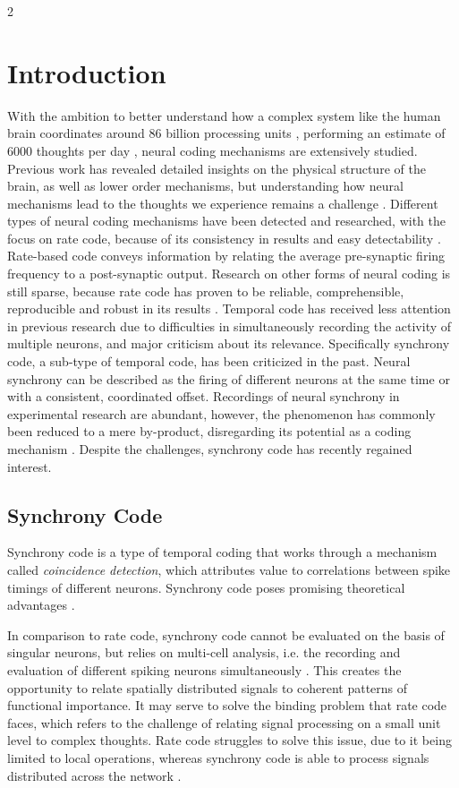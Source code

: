 \documentclass[12pt,a4paper]{article}
\begin{document}
	\begin{multicols}{2}
    \raggedcolumns

        \section{Introduction}
			With the ambition to better understand how a complex system like the human brain coordinates around 86 billion processing units \cite{U}, performing an estimate of 6000 thoughts per day \cite{T}, neural coding mechanisms are extensively studied. Previous work has revealed detailed insights on the physical structure of the brain, as well as lower order mechanisms, but understanding how neural mechanisms lead to the thoughts we experience remains a challenge \cite{R}. Different types of neural coding mechanisms have been detected and researched, with the focus on rate code, because of its consistency in results and easy detectability \cite{X, R, L}. Rate-based code conveys information by relating the average pre-synaptic firing frequency to a post-synaptic output. Research on other forms of neural coding is still sparse, because rate code has proven to be reliable, comprehensible, reproducible and robust in its results \cite{X}. Temporal code has received less attention in previous research due to difficulties in simultaneously recording the activity of multiple neurons, and major criticism about its relevance. Specifically synchrony code, a sub-type of temporal code, has been criticized in the past. Neural synchrony can be described as the firing of different neurons at the same time or with a consistent, coordinated offset. Recordings of neural synchrony in experimental research are abundant, however, the phenomenon has commonly been reduced to a mere by-product, disregarding its potential as a coding mechanism \cite{M, L, G}. Despite the challenges, synchrony code has recently regained interest.
            
        \subsection{Synchrony Code}
            Synchrony code is a type of temporal coding that works through a mechanism called \textit{coincidence detection}, which attributes value to correlations between spike timings of different neurons. Synchrony code poses promising theoretical advantages \cite{R}.
            
            In comparison to rate code, synchrony code cannot be evaluated on the basis of singular neurons, but relies on multi-cell analysis, i.e. the recording and evaluation of different spiking neurons simultaneously \cite{G}. This creates the opportunity to relate spatially distributed signals to coherent patterns of functional importance. It may serve to solve the binding problem that rate code faces, which refers to the challenge of relating signal processing on a small unit level to complex thoughts. Rate code struggles to solve this issue, due to it being limited to local operations, whereas synchrony code is able to process signals distributed across the network \cite{G, R}.
            

\end{multicols}
\end{document}
